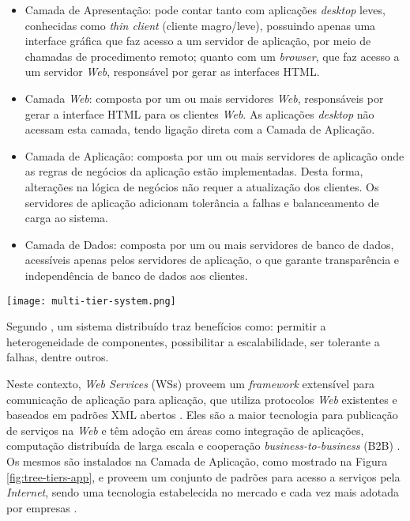 \begin{itemize}
	\item Camada de Apresentação: pode contar tanto com aplicações \textit{desktop} leves, conhecidas como \textit{thin client} (cliente magro/leve),
  possuindo apenas uma interface gráfica que faz acesso a um servidor de aplicação, por meio de chamadas de procedimento remoto; quanto com um \textit{browser}, que faz acesso a um servidor \textit{Web}, responsável por gerar as interfaces HTML.
  \item Camada \textit{Web}: composta por um ou mais servidores \textit{Web}, responsáveis por gerar a interface HTML para os clientes \textit{Web}. As aplicações \textit{desktop} não acessam esta camada, tendo ligação direta com a Camada de Aplicação. 
  \item Camada de Aplicação: composta por um ou mais servidores de aplicação onde as regras de negócios da aplicação estão implementadas. Desta forma, alterações na lógica de negócios não requer a atualização dos clientes. Os servidores de aplicação adicionam tolerância a falhas e balanceamento de carga ao sistema.
  \item Camada de Dados: composta por um ou mais servidores de banco de dados, acessíveis apenas pelos servidores de aplicação, o que garante transparência e independência de banco de dados aos clientes.
\end{itemize}

\begin{center}
	\texttt{[image: multi-tier-system.png]}
	\label{fig:tree-tiers-app}
\end{center}

Segundo \cite{coulouris2007sisdist}, um sistema distribuído traz benefícios como: permitir a heterogeneidade de componentes,
possibilitar a escalabilidade, ser tolerante a falhas, dentre outros.

Neste contexto, \textit{Web Services} (WSs) proveem um \textit{framework} extensível para comunicação de aplicação para aplicação, que utiliza protocolos \textit{Web} existentes e baseados em padrões XML abertos \cite{curbera2002unraveling}. Eles são a maior tecnologia para publicação de serviços na \textit{Web} e têm  adoção em áreas como integração de aplicações, computação distribuída de larga escala e cooperação \textit{business-to-business} (B2B) \cite{kopecky2008semantic}. Os mesmos são instalados na Camada de Aplicação, como mostrado na Figura \ref{fig:tree-tiers-app}, e proveem um conjunto de padrões para acesso a serviços pela \textit{Internet}, sendo uma tecnologia estabelecida no mercado e cada vez mais adotada por empresas \cite{lausen2007finding}.

